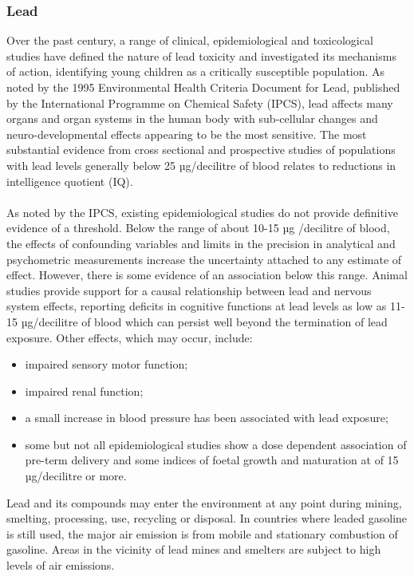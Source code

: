 \subsubsection{Lead}
Over the past century, a range of clinical, epidemiological and toxicological studies have defined the nature of lead toxicity and investigated its mechanisms of action, identifying young children as a critically susceptible population. As noted by the 1995 Environmental Health Criteria Document for Lead, published by the International Programme on Chemical Safety (IPCS), lead affects many organs and organ systems in the human body with sub-cellular changes and neuro-developmental effects appearing to be the most sensitive. The most substantial evidence from cross sectional and prospective studies of populations with lead levels generally below 25 µg/decilitre of blood relates to reductions in intelligence quotient (IQ).\\\\
As noted by the IPCS, existing epidemiological studies do not provide definitive evidence of a threshold. Below the range of about 10-15 µg /decilitre of blood, the effects of confounding variables and limits in the precision in analytical and psychometric measurements increase the uncertainty attached to any estimate of effect. However, there is some evidence of an association below this range. Animal studies provide support for a causal relationship between lead and nervous system effects, reporting deficits in cognitive functions at lead levels as low as 11-15 µg/decilitre of blood which can persist well beyond the termination of lead exposure. Other effects, which may occur, include:
\begin{itemize}
	\item impaired sensory motor function;
	\item impaired renal function;
	\item a small increase in blood pressure has been associated with lead exposure;
	\item some but not all epidemiological studies show a dose dependent association of pre-term delivery and some indices of foetal growth and maturation at of 15 µg/decilitre or more.
\end{itemize}
Lead and its compounds may enter the environment at any point during mining, smelting, processing, use, recycling or disposal. In countries where leaded gasoline is still used, the major air emission is from mobile and stationary combustion of gasoline. Areas in the vicinity of lead mines and smelters are subject to high levels of air emissions.\\\\
